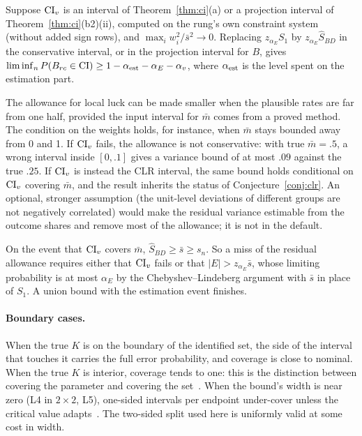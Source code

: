 \begin{proposition}\label{prop:bd}
Suppose $\mathrm{CI}_v$ is an interval of Theorem~\ref{thm:ci}(a) or a projection interval
of Theorem~\ref{thm:ci}(b2)(ii), computed on the rung's own constraint system
(without added sign rows), and $\max_iw_i^2/\bar s^2\to0$. Replacing $z_{\alpha_E}S_1$
by $z_{\alpha_E}\hat S_{BD}$ in the conservative interval, or in the projection
interval for $B$, gives
$\liminf_nP(B_{rc}\in\mathrm{CI})\ge1-\alpha_{\rm est}-\alpha_E-\alpha_v$, where
$\alpha_{\rm est}$ is the level spent on the estimation part.
\end{proposition}
\begin{reading}
The allowance for local luck can be made smaller when the plausible rates are far
from one half, provided the input interval for $\bar m$ comes from a proved
method. The condition on the weights holds, for instance, when $\bar m$ stays
bounded away from 0 and 1. If $\mathrm{CI}_v$ fails, the allowance is not conservative:
with true $\bar m=.5$, a wrong interval inside $[0,.1]$ gives a variance bound of at
most $.09$ against the true $.25$. If $\mathrm{CI}_v$ is instead the CLR interval, the
same bound holds conditional on $\mathrm{CI}_v$ covering $\bar m$, and the result inherits
the status of Conjecture~\ref{conj:clr}. An optional, stronger assumption (the
unit-level deviations of different groups are not negatively correlated) would
make the residual variance estimable from the outcome shares and remove most of
the allowance; it is not in the default.
\end{reading}
\begin{sketch}
On the event that $\mathrm{CI}_v$ covers $\bar m$, $\hat S_{BD}\ge\bar s\ge s_n$. So a
miss of the residual allowance requires either that $\mathrm{CI}_v$ fails or that
$|E|>z_{\alpha_E}\bar s$, whose limiting probability is at most $\alpha_E$ by the
Chebyshev--Lindeberg argument with $\bar s$ in place of $S_1$. A union bound with
the estimation event finishes.
\end{sketch}

\paragraph{Boundary cases.} When the true $K$ is on the boundary of the identified
set, the side of the interval that touches it carries the full error probability,
and coverage is close to nominal. When the true $K$ is interior, coverage tends to
one: this is the distinction between covering the parameter and covering the
set~\citep{imbensmanski2004}. When the bound's width is near zero (L4 in
$2\times2$, L5), one-sided intervals per endpoint under-cover unless the critical
value adapts~\citep{stoye2009}. The two-sided split used here is uniformly valid
at some cost in width.

